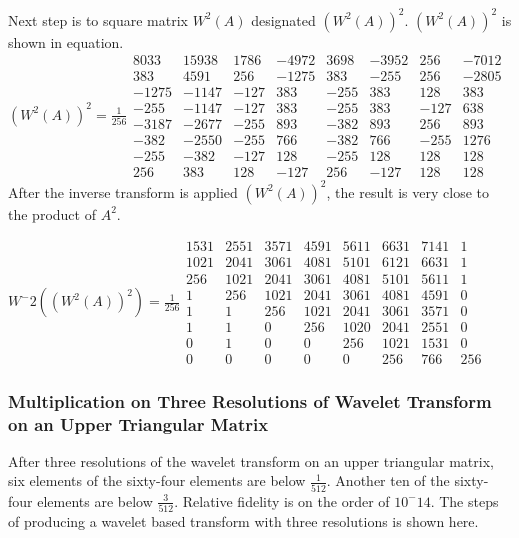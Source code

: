 \documentclass{article}
\begin{document}
Next step is to square matrix $W^2(A)$ designated $(W^2(A))^2$.  $(W^2(A))^2$ is shown in equation.
$
(W^2(A))^2= \frac{1}{256}
\begin{array}{cccccccc}
8033 & 15938 & 1786 & -4972 & 3698 & -3952 & 256 & -7012\\
383 & 4591 & 256 & -1275 & 383 & -255 & 256 & -2805\\
-1275 & -1147 & -127 & 383 & -255 & 383 & 128 & 383\\
-255 & -1147 & -127 & 383 & -255 & 383 & -127 & 638\\
-3187 & -2677 & -255 & 893 & -382 & 893 & 256 & 893\\
-382 & -2550 & -255 & 766 & -382 & 766 & -255 & 1276\\
-255 & -382 & -127 & 128 & -255 & 128 & 128 & 128\\
256 & 383 & 128 & -127 & 256 & -127 & 128 & 128
\end{array}
$ 
After the inverse transform is applied $(W^2(A))^2$, the result is very close to the product of $A^2$.

$
W^-2((W^2(A))^2)= \frac{1}{256}
\begin{array}{cccccccc}
1531 & 2551 & 3571 & 4591 & 5611 & 6631 & 7141 & 1\\
1021 & 2041 & 3061 & 4081 & 5101 & 6121 & 6631 & 1\\ 
256 & 1021 & 2041 & 3061 & 4081 & 5101 & 5611 & 1\\
1 & 256 & 1021 & 2041 & 3061 & 4081 & 4591 & 0\\
1 & 1 & 256 & 1021 & 2041 & 3061 & 3571 & 0\\
1 & 1 & 0 & 256 & 1020 & 2041 & 2551 & 0\\
0 & 1 & 0 & 0 & 256 & 1021 & 1531 & 0\\
0 & 0 & 0 & 0 & 0 & 256 & 766 & 256
\end{array}
$

\subsubsection {Multiplication on Three Resolutions of Wavelet Transform on an Upper Triangular Matrix}
After three resolutions of the wavelet transform on an upper triangular matrix, six elements of the sixty-four elements are below $\frac{1}{512}$.  Another ten of the sixty-four elements are below $\frac{3}{512}$.    Relative fidelity is on the order of $10^-14$.  The steps of producing a wavelet based transform with three resolutions is shown here.
\end{document}
